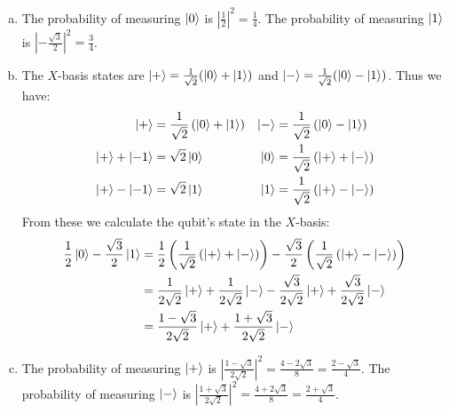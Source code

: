 \documentclass[12pt]{extarticle}
\begin{document}
\begin{enumerate}[(a)]
\item The probability of measuring $\ket{0}$ is $\left|\frac{1}{2}\right|^2 = \frac{1}{4}$.
The probability of measuring $\ket{1}$ is $\left|-\frac{\sqrt{3}}{2}\right|^2 = \frac{3}{4}$.
\item The $X$-basis states are $\ket{+} = \frac{1}{\sqrt{2}}(\ket{0} + \ket{1})$ and $\ket{-} = \frac{1}{\sqrt{2}}(\ket{0} - \ket{1})$.
Thus we have:
\begin{align*}
\ket{+} & = \frac{1}{\sqrt{2}}\left(\ket{0}+\ket{1}\right) & \ket{-} & = \frac{1}{\sqrt{2}}\left(\ket{0}-\ket{1}\right) \\
\ket{+} + \ket{-1} & = \sqrt{2}\ket{0} & \ket{0} & = \frac{1}{\sqrt{2}}\left(\ket{+}+\ket{-}\right) \\
\ket{+} - \ket{-1} & = \sqrt{2}\ket{1} & \ket{1} & = \frac{1}{\sqrt{2}}\left(\ket{+}-\ket{-}\right)
\end{align*}
From these we calculate the qubit's state in the $X$-basis:
\begin{align*}
\frac{1}{2}\ket{0} - \frac{\sqrt{3}}{2}\ket{1} & = \frac{1}{2}\left(\frac{1}{\sqrt{2}}\left(\ket{+}+\ket{-}\right)\right) - \frac{\sqrt{3}}{2}\left(\frac{1}{\sqrt{2}}\left(\ket{+}-\ket{-}\right)\right) \\
& = \frac{1}{2\sqrt{2}}\ket{+} + \frac{1}{2\sqrt{2}}\ket{-} - \frac{\sqrt{3}}{2\sqrt{2}}\ket{+} + \frac{\sqrt{3}}{2\sqrt{2}}\ket{-} \\
& = \frac{1-\sqrt{3}}{2\sqrt{2}}\ket{+} + \frac{1+\sqrt{3}}{2\sqrt{2}}\ket{-}
\end{align*}
\item The probability of measuring $\ket{+}$ is $\left|\frac{1-\sqrt{3}}{2\sqrt{2}}\right|^2 = \frac{4-2\sqrt{3}}{8} = \frac{2-\sqrt{3}}{4}$.
The probability of measuring $\ket{-}$ is $\left|\frac{1+\sqrt{3}}{2\sqrt{2}}\right|^2 = \frac{4+2\sqrt{3}}{8} = \frac{2+\sqrt{3}}{4}$.
\end{enumerate}
\end{document}
